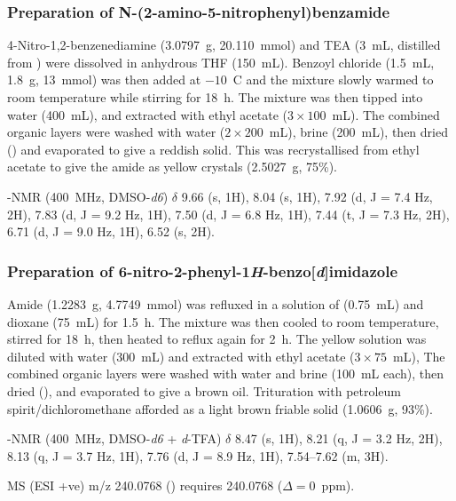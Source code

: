 \begin{refsection}
\subsubsection[Preparation of \refcmpd{rhs-nitro-amide}]{Preparation of N-(2-amino-5-nitrophenyl)benzamide }
4-Nitro-1,2-benzenediamine (3.0797~g, 20.110~mmol) and TEA (3~mL, distilled from ) were dissolved in anhydrous THF (150~mL).
Benzoyl chloride (1.5~mL, 1.8~g, 13~mmol) was then added at $-10$~\degree{}C and the mixture slowly warmed to room temperature while stirring for 18~h.
The mixture was then tipped into water (400~mL), and extracted with ethyl acetate ($3\times100$~mL).
The combined organic layers were washed with water ($2\times200$~mL), brine (200~mL), then dried () and evaporated to give a reddish solid.
This was recrystallised from ethyl acetate to give the amide  as yellow crystals (2.5027~g, 75\%).\autocite{Patrick2017}

-NMR (400~MHz, DMSO-\emph{d6}) $\delta$ 9.66 (s, 1H), 8.04 (s, 1H), 7.92 (d, J = 7.4 Hz, 2H), 7.83 (d, J = 9.2 Hz, 1H), 7.50 (d, J = 6.8 Hz, 1H), 7.44 (t, J = 7.3 Hz, 2H), 6.71 (d, J = 9.0 Hz, 1H), 6.52 (s, 2H).

\subsubsection[Preparation of \refcmpd{rhs-nitro}]{Preparation of 6-nitro-2-phenyl-1\emph{H}-benzo[\emph{d}]imidazole }
Amide  (1.2283~g, 4.7749~mmol) was refluxed in a solution of  (0.75~mL) and dioxane (75~mL) for 1.5~h.
The mixture was then cooled to room temperature, stirred for 18~h, then heated to reflux again for 2~h.
The yellow solution was diluted with water (300~mL) and extracted with ethyl acetate ($3\times75$~mL),
The combined organic layers were washed with water and brine (100~mL each), then dried (), and evaporated to give a brown oil.
Trituration with petroleum spirit/dichloromethane afforded  as a light brown friable solid (1.0606~g, 93\%).\autocite{Patrick2017}

-NMR (400~MHz, DMSO-\emph{d6} + \textit{d}-TFA) $\delta$ 8.47 (s, 1H), 8.21 (q, J = 3.2 Hz, 2H), 8.13 (q, J = 3.7 Hz, 1H), 7.76 (d, J = 8.9 Hz, 1H), 7.54--7.62 (m, 3H).

MS (ESI +ve) m/z 240.0768 ()  requires 240.0768 ($\Delta=0$~ppm).


\end{refsection}
